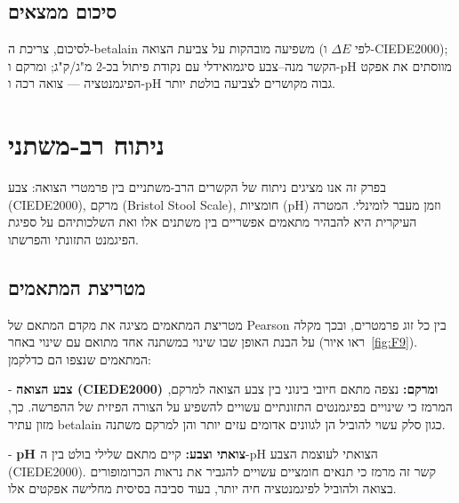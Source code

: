 \subsection{\texthebrew{סיכום ממצאים}}

\begin{hebrew}לסיכום, צריכת ה-\textenglish{betalain} משפיעה מובהקות על צביעת הצואה (לפי $\Delta E$ ו-\textenglish{CIEDE2000}); הקשר מנה--צבע סיגמואידלי עם נקודת פיתול בכ-2 מ"ג/ק"ג; ומרקם ו-\textenglish{pH} מווסתים את אפקט הפיגמנטציה — צואה רכה ו-\textenglish{pH} גבוה מקושרים לצביעה בולטת יותר.\end{hebrew}

\section{\texthebrew{ניתוח רב-משתני}}

\begin{hebrew}בפרק זה אנו מציגים ניתוח של הקשרים הרב-משתניים בין פרמטרי הצואה: צבע (\textenglish{CIEDE2000}), מרקם (\textenglish{Bristol Stool Scale}), חומציות (\textenglish{pH}) וזמן מעבר לומינלי. המטרה העיקרית היא להבהיר מתאמים אפשריים בין משתנים אלו ואת השלכותיהם על ספיגת הפיגמנט התזונתי והפרשתו.\end{hebrew}

\subsection{\texthebrew{מטריצת המתאמים}}

\begin{hebrew}מטריצת המתאמים מציגה את מקדם המתאם של \textenglish{Pearson} בין כל זוג פרמטרים, ובכך מקלה על הבנת האופן שבו שינוי במשתנה אחד מתואם עם שינוי באחר (ראו איור~\ref{fig:F9}). המתאמים שנצפו הם כדלקמן:\end{hebrew}

\begin{hebrew}- \textbf{צבע הצואה (\textenglish{CIEDE2000}) ומרקם:} נצפה מתאם חיובי בינוני בין צבע הצואה למרקם, המרמז כי שינויים בפיגמנטים התזונתיים עשויים להשפיע על הצורה הפיזית של ההפרשה. כך, מזון עתיר \textenglish{betalain} כגון סלק עשוי להוביל הן לגוונים אדומים עזים יותר והן למרקם משתנה.\end{hebrew}

\begin{hebrew}- \textbf{\textenglish{pH} צואתי וצבע:} קיים מתאם שלילי בולט בין ה-\textenglish{pH} הצואתי לעוצמת הצבע (\textenglish{CIEDE2000}). קשר זה מרמז כי תנאים חומציים עשויים להגביר את נראות הכרומופורים בצואה ולהוביל לפיגמנטציה חיה יותר, בעוד סביבה בסיסית מחלישה אפקטים אלו.\end{hebrew}

